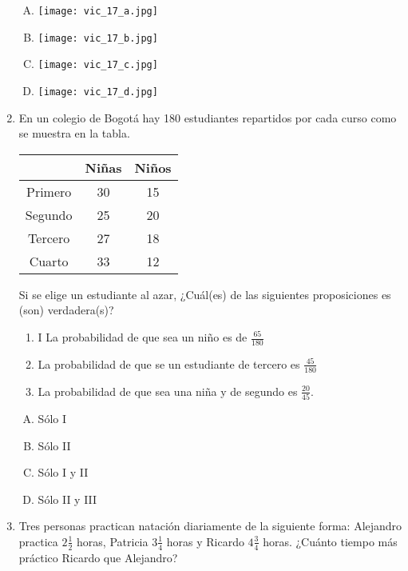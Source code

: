 \begin{enumerate}
\begin{enumerate}[(A)]
\item \texttt{[image: vic\_17\_a.jpg]} 
\item \texttt{[image: vic\_17\_b.jpg]} 
\item \texttt{[image: vic\_17\_c.jpg]} 
\item \texttt{[image: vic\_17\_d.jpg]} 
\end{enumerate}


\item  En un colegio de Bogotá hay 180 estudiantes repartidos por cada curso como se muestra en la tabla.\label{vic-18}

\begin{center}
\begin{tabular}{|c|cc|}
\hline 
 & Niñas & Niños \\ 
\hline \hline 
Primero & 30 & 15 \\ 
Segundo & 25 & 20 \\ 
Tercero & 27 & 18 \\ 
Cuarto & 33 & 12 \\ 
\hline 
\end{tabular} 
\end{center}


 Si se elige un estudiante al azar, ¿Cuál(es) de las siguientes proposiciones es (son) verdadera(s)?  
 \begin{enumerate}[I]
 \item I La probabilidad de que sea un niño es de $\frac{65}{180}$
\item La probabilidad de que se un estudiante de tercero es  $\frac{45}{180}$
\item La probabilidad de que sea una niña y de segundo es  $\frac{20}{45}$. 
 \end{enumerate}
\begin{enumerate}[(A)]
\item Sólo I
\item Sólo II
\item Sólo I y II
\item Sólo II y III
\end{enumerate}

 \item Tres personas practican natación diariamente de la siguiente forma:\label{vic-19}
Alejandro practica $2\frac{1}{2}$ horas, Patricia $3\frac{1}{4}$ horas y Ricardo $4\frac{3}{4}$ horas. 
¿Cuánto tiempo más práctico  Ricardo que Alejandro?


\end{enumerate}
